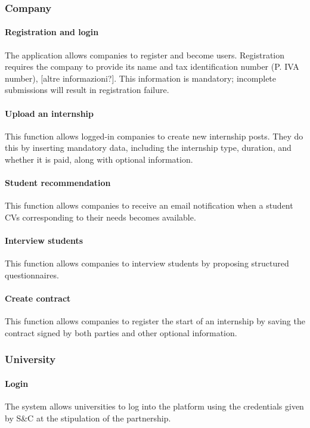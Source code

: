 \subsubsection{Company}
    \paragraph{Registration and login}
    The application allows companies to register and become users.  Registration requires the company to provide its name and tax identification number (P. IVA number), [altre informazioni?].  This information is mandatory; incomplete submissions will result in registration failure.
    \paragraph{Upload an internship\\}
    This function allows logged-in companies to create new internship posts. They do this by inserting mandatory data, including the internship type, duration, and whether it is paid, along with optional information.
    \paragraph{Student recommendation\\}
    This function allows companies to receive an email notification when a student CVs corresponding to their needs becomes available.
    \paragraph{Interview students\\}
    This function allows companies to interview students by proposing structured questionnaires.
    \paragraph{Create contract\\}
    This function allows companies to register the start of an internship by saving the contract signed by both parties and other optional information.
\subsubsection{University}
    \paragraph{Login\\}
    The system allows universities to log into the platform using the credentials given by S\&C at the stipulation of the partnership.
